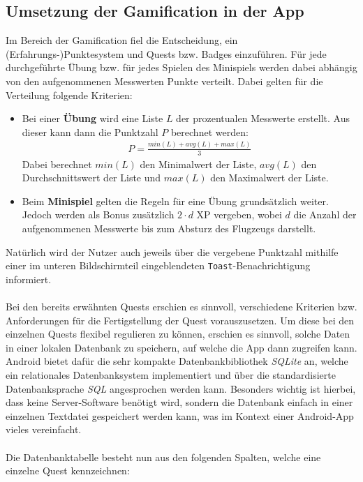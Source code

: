 \subsection{Umsetzung der Gamification in der App}
Im Bereich der Gamification fiel die Entscheidung, ein (Erfahrungs-)Punktesystem und Quests bzw. Badges einzuführen. Für jede durchgeführte Übung bzw. für jedes Spielen des Minispiels werden dabei abhängig von den aufgenommenen Messwerten Punkte verteilt. Dabei gelten für die Verteilung folgende Kriterien:
\begin{itemize}
	\item Bei einer \textbf{Übung} wird eine Liste $L$ der prozentualen Messwerte erstellt. Aus dieser kann dann die Punktzahl $P$ berechnet werden:
	\begin{align*}
	P = \frac{min(L) + avg(L) + max(L)}{3}
	\end{align*}
	Dabei berechnet $min(L)$ den Minimalwert der Liste, $avg(L)$ den Durchschnittswert der Liste und $max(L)$ den Maximalwert der Liste.
	\item Beim \textbf{Minispiel} gelten die Regeln für eine Übung grundsätzlich weiter. Jedoch werden als Bonus zusätzlich $2 \cdot d$ XP vergeben, wobei $d$ die Anzahl der aufgenommenen Messwerte bis zum Absturz des Flugzeugs darstellt.
\end{itemize}
Natürlich wird der Nutzer auch jeweils über die vergebene Punktzahl mithilfe einer im unteren Bildschirmteil eingeblendeten \texttt{Toast}-Benachrichtigung informiert. \\ \\
Bei den bereits erwähnten Quests erschien es sinnvoll, verschiedene Kriterien bzw. Anforderungen für die Fertigstellung der Quest vorauszusetzen. Um diese bei den einzelnen Quests flexibel regulieren zu können, erschien es sinnvoll, solche Daten in einer lokalen Datenbank zu speichern, auf welche die App dann zugreifen kann. Android bietet dafür die sehr kompakte Datenbankbibliothek \textit{SQLite} an, welche ein relationales Datenbanksystem implementiert und über die standardisierte Datenbanksprache \textit{SQL} angesprochen werden kann.\cite{Src:AndroidKuenneth} Besonders wichtig ist hierbei, dass keine Server-Software benötigt wird, sondern die Datenbank einfach in einer einzelnen Textdatei gespeichert werden kann, was im Kontext einer Android-App vieles vereinfacht.\cite{Src:AndroidKuenneth} \\ \\
Die Datenbanktabelle besteht nun aus den folgenden Spalten, welche eine einzelne Quest kennzeichnen:
